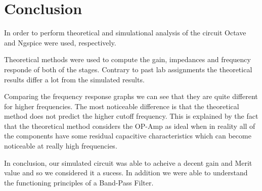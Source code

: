 
\section{Conclusion}
\label{sec:conclusion}



In order to perform theoretical and simulational analysis of the circuit Octave and Ngspice were used, respectively.


Theoretical methods were used to compute the gain, impedances and frequency responde of both of the stages. Contrary to past lab assignments the theoretical results differ a lot from the simulated results.

Comparing the frequency response graphs we can see that they are quite different for higher frequencies. The most noticeable difference is that the theoretical method does not predict the higher cutoff frequency. This is explained by the fact that the theoretical method considers the OP-Amp as ideal when in reality all of the components have some residual capacitive characteristics which can become noticeable at really high frequencies.

In conclusion, our simulated circuit was able to acheive a decent gain and Merit value and so we considered it a sucess. In addition we were able to understand the functioning principles of a Band-Pass Filter.
